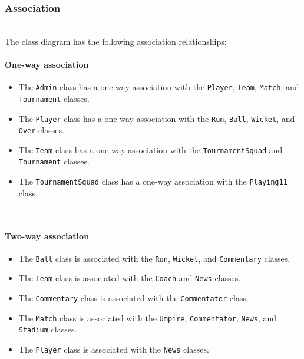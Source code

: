 \subsubsection{Association}\label{LZd7fmUfc9JcRnHlG4hg0}
\\
The class diagram has the following association relationships:
\\
\paragraph{One-way association}\label{HtaSB-7SLOrz6NIXCWAop}

\begin{itemize}
\item
\protect{}\label{hTpEg7o6T3qKkk_BQouaw}
The \texttt{Admin} class has a one-way association with the \texttt{Player}, \texttt{Team}, \texttt{Match}, and \texttt{Tournament} classes.
\item
\protect{}\label{DYzF7u0zp2UH-1yzcRzvs}
The \texttt{Player} class has a one-way association with the \texttt{Run}, \texttt{Ball}, \texttt{Wicket}, and \texttt{Over} classes.
\item
\protect{}\label{atvPAal5_a88_tFrGyX2_}
The \texttt{Team} class has a one-way association with the \texttt{TournamentSquad} and \texttt{Tournament} classes.
\item
\protect{}\label{9OPJPQUtZrJh6vmSrd5K_}
The \texttt{TournamentSquad} class has a one-way association with the \texttt{Playing11} class.
\end{itemize}
\\
\paragraph{Two-way association}\label{GUVn9O93ioQZ7owKg6pBJ}

\begin{itemize}
\item
\protect{}\label{GOIVLgtpjvoM5MCRzrtV3}
The \texttt{Ball} class is associated with the \texttt{Run}, \texttt{Wicket}, and \texttt{Commentary} classes.
\item
\protect{}\label{seEOPXyZjT_61pSC-a5VW}
The \texttt{Team} class is associated with the \texttt{Coach} and \texttt{News} classes.
\item
\protect{}\label{Bk0Ucxhl6w9-GtEcX_DPS}
The \texttt{Commentary} class is associated with the \texttt{Commentator} class.
\item
\protect{}\label{2BUcqY_Y1viPg8aHYB4t5}
The \texttt{Match} class is associated with the \texttt{Umpire}, \texttt{Commentator}, \texttt{News}, and \texttt{Stadium} classes.
\item
\protect{}\label{seEOPXyZjT_61pSC-a5VW}
The \texttt{Player} class is associated with the \texttt{News} classes.
\end{itemize}

